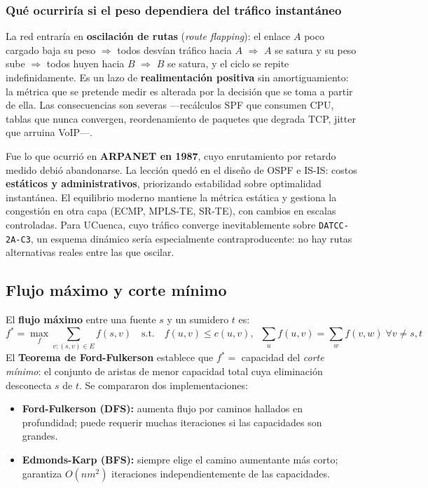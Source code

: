 \documentclass[11pt, a4paper]{article}
\begin{document}
\subsubsection*{Qué ocurriría si el peso dependiera del tráfico instantáneo}

La red entraría en \textbf{oscilación de rutas} (\textit{route flapping}):
el enlace $A$ poco cargado baja su peso $\Rightarrow$ todos desvían tráfico
hacia $A$ $\Rightarrow$ $A$ se satura y su peso sube $\Rightarrow$ todos
huyen hacia $B$ $\Rightarrow$ $B$ se satura, y el ciclo se repite
indefinidamente. Es un lazo de \textbf{realimentación positiva} sin
amortiguamiento: la métrica que se pretende medir es alterada por la
decisión que se toma a partir de ella. Las consecuencias son severas
—recálculos SPF que consumen CPU, tablas que nunca convergen, reordenamiento
de paquetes que degrada TCP, jitter que arruina VoIP—.

Fue lo que ocurrió en \textbf{ARPANET en 1987}, cuyo enrutamiento por
retardo medido debió abandonarse. La lección quedó en el diseño de OSPF e
IS-IS: costos \textbf{estáticos y administrativos}, priorizando estabilidad
sobre optimalidad instantánea. El equilibrio moderno mantiene la métrica
estática y gestiona la congestión en otra capa (ECMP, MPLS-TE, SR-TE), con
cambios en escalas controladas. Para UCuenca, cuyo tráfico converge
inevitablemente sobre \texttt{DATCC-2A-C3}, un esquema dinámico sería
especialmente contraproducente: no hay rutas alternativas reales entre las
que oscilar.

\subsection{Flujo máximo y corte mínimo}

El \textbf{flujo máximo} entre una fuente $s$ y un sumidero $t$ es:
\[
  f^* = \max_{f} \sum_{v:(s,v)\in E} f(s,v)
  \quad \text{s.t.} \quad
  f(u,v) \leq c(u,v),\;\; \sum_u f(u,v) = \sum_w f(v,w) \;\forall v \neq s,t
\]
El \textbf{Teorema de Ford-Fulkerson} establece que $f^* = $ capacidad del
\textit{corte mínimo}: el conjunto de aristas de menor capacidad total cuya
eliminación desconecta $s$ de $t$. Se compararon dos implementaciones:
\begin{itemize}
  \item \textbf{Ford-Fulkerson (DFS):} aumenta flujo por caminos hallados en
        profundidad; puede requerir muchas iteraciones si las capacidades son grandes.
  \item \textbf{Edmonds-Karp (BFS):} siempre elige el camino aumentante más
        corto; garantiza $O(nm^2)$ iteraciones independientemente de las capacidades.
\end{itemize}
\end{document}
